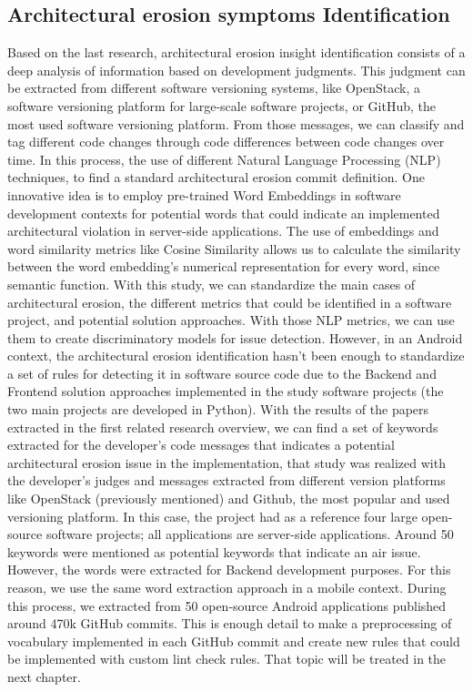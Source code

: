 \subsection{Architectural erosion symptoms Identification}
Based on the last research, architectural erosion insight identification consists of a deep analysis of information based on development judgments. This judgment can be extracted from different software versioning systems, like OpenStack, a software versioning platform for large-scale software projects, or GitHub, the most used software versioning platform. From those messages, we can classify and tag different code changes through code differences between code changes over time. In this process, the use of different Natural Language Processing (NLP) techniques, to find a standard architectural erosion commit definition. One innovative idea is to employ pre-trained Word Embeddings in software development contexts for potential words that could indicate an implemented architectural violation in server-side applications. The use of embeddings and word similarity metrics like Cosine Similarity allows us to calculate the similarity between the word embedding's numerical representation for every word, since semantic function. With this study, we can standardize the main cases of architectural erosion, the different metrics that could be identified in a software project, and potential solution approaches.
With those NLP metrics, we can use them to create discriminatory models for issue detection. However, in an Android context, the architectural erosion identification hasn't been enough to standardize a set of rules for detecting it in software source code due to the Backend and Frontend solution approaches implemented in the study software projects (the two main projects are developed in Python).
With the results of the papers extracted in the first related research overview, we can find a set of keywords extracted for the developer's code messages that indicates a potential architectural erosion issue in the implementation, that study was realized with the developer's judges and messages extracted from different version platforms like OpenStack (previously mentioned) and Github, the most popular and used versioning platform. In this case, the project had as a reference four large open-source software projects; all applications are server-side applications. Around 50 keywords were mentioned as potential keywords that indicate an air issue.
However, the words were extracted for Backend development purposes. For this reason, we use the same word extraction approach in a mobile context. During this process, we extracted from 50 open-source Android applications published around 470k GitHub commits. This is enough detail to make a preprocessing of vocabulary implemented in each GitHub commit and create new rules that could be implemented with custom lint check rules. That topic will be treated in the next chapter.

